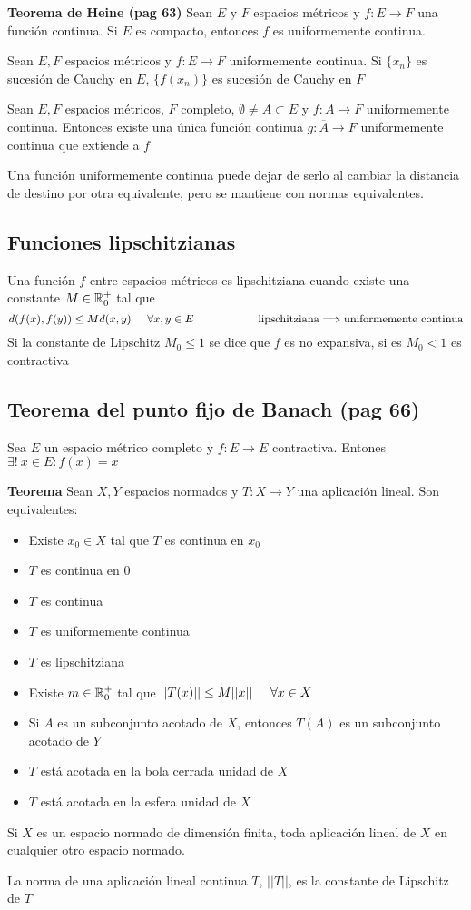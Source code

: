 \textbf{Teorema de Heine (pag 63)} Sean $E$ y $F$ espacios métricos y $f:E\rightarrow F$ una función continua. Si $E$ es compacto, entonces $f$ es uniformemente continua.

Sean $E,F$ espacios métricos y $f:E\rightarrow F$ uniformemente continua. Si $\{x_n\}$ es sucesión de Cauchy en $E$, $\{f(x_n)\}$ es sucesión de Cauchy en $F$

Sean $E,F$ espacios métricos, $F$ completo, $\emptyset \not =A\subset E$ y $f:A\rightarrow F$ uniformemente continua. Entonces existe una única función continua $g:\overline{A}\rightarrow F$ uniformemente continua que extiende a $f$

Una función uniformemente continua puede dejar de serlo al cambiar la distancia de destino por otra equivalente, pero se mantiene con normas equivalentes.

\subsection{Funciones lipschitzianas}
Una función $f$ entre espacios métricos es lipschitziana cuando existe una constante $M\in\mathbb{R}^+_0$ tal que 
$$ d(f(x), f(y)) \leq Md(x,y) \hspace{0.5cm} \forall x,y\in E\hspace{2cm}\text{lipschitziana$\implies$uniformemente continua}$$
Si la constante de Lipschitz $M_0\leq 1$ se dice que $f$ es no expansiva, si es $M_0<1$ es contractiva
\subsection{Teorema del punto fijo de Banach (pag 66)}
Sea $E$ un espacio métrico completo y $f:E\rightarrow E$ contractiva. Entones $\exists !\ x\in E : f(x) = x$

\textbf{Teorema}
Sean $X,Y$ espacios normados y $T:X\rightarrow Y$ una aplicación lineal. Son equivalentes:
\begin{itemize}
	\item Existe $x_0\in X$ tal que $T$ es continua en $x_0$
	\item $T$ es continua en $0$
	\item $T$ es continua
	\item $T$ es uniformemente continua
	\item $T$ es lipschitziana
	\item Existe $m\in\mathbb{R}^+_0$ tal que $||T(x)||\leq M||x||\hspace{0.5cm} \forall x\in X$
	\item Si $A$ es un subconjunto acotado de $X$, entonces $T(A)$ es un subconjunto acotado de $Y$
	\item $T$ está acotada en la bola cerrada unidad de $X$
	\item $T$ está acotada en la esfera unidad de $X$
\end{itemize}
Si $X$ es un espacio normado de dimensión finita, toda aplicación lineal de $X$ en cualquier otro espacio normado.

La norma de una aplicación lineal continua $T$, $||T||$, es la constante de Lipschitz de $T$